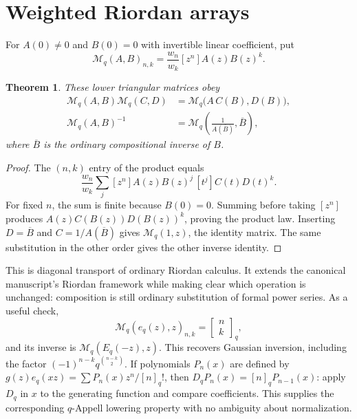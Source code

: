 \documentclass[11pt,a4paper,oneside,openany]{book}
\newtheorem{theorem}{Theorem}[chapter]
\theoremstyle{definition}
\theoremstyle{remark}
\newcommand{\GB}[3][q]{\begin{bmatrix}#2\\#3\end{bmatrix}_{#1}}
\newcommand{\G}[2]{\GB{#1}{#2}}
\newcommand{\qnum}[1]{[#1]_q}
\newcommand{\Dq}{D_q}
\begin{document}
\section{Weighted Riordan arrays}
For \(A(0)\ne0\) and \(B(0)=0\) with invertible linear coefficient, put
\begin{equation}\label{q1:qcc:riordan-def}
 \mathcal M_q(A,B)_{n,k}=\frac{w_n}{w_k}[z^n]A(z)B(z)^k.
\end{equation}
\begin{theorem}\label{q1:qcc:riordan-group}
These lower triangular matrices obey
\begin{align}
 \mathcal M_q(A,B)\mathcal M_q(C,D)
 &=\mathcal M_q\bigl(A\,C(B),D(B)\bigr),\label{q1:qcc:riordan-product}\\
 \mathcal M_q(A,B)^{-1}
 &=\mathcal M_q\left(\frac1{A(\overline B)},\overline B\right),
 \label{q1:qcc:riordan-inverse}
\end{align}
where \(\overline B\) is the ordinary compositional inverse of \(B\).
\end{theorem}
\begin{proof}
The \((n,k)\) entry of the product equals
\[
 \frac{w_n}{w_k}\sum_j[z^n]A(z)B(z)^j\,[t^j]C(t)D(t)^k.
\]
For fixed \(n\), the sum is finite because \(B(0)=0\). Summing before taking
\([z^n]\) produces \(A(z)C(B(z))D(B(z))^k\), proving the product law.
Inserting \(D=\overline B\) and \(C=1/A(\overline B)\) gives
\(\mathcal M_q(1,z)\), the identity matrix. The same substitution in the other
order gives the other inverse identity.
\end{proof}
This is diagonal transport of ordinary Riordan calculus. It extends the canonical manuscript's
Riordan framework while making clear which operation is unchanged: composition
is still ordinary substitution of formal power series.
As a useful check,
\[
 \mathcal M_q(e_q(z),z)_{n,k}=\G nk,
\]
and its inverse is $\mathcal M_q(E_q(-z),z)$. This recovers Gaussian inversion,
including the factor $(-1)^{n-k}q^{\binom{n-k}2}$.
If polynomials $P_n(x)$ are defined by
$g(z)e_q(xz)=\sum P_n(x)z^n/[n]_q!$, then
$\Dq P_n(x)=\qnum n P_{n-1}(x)$: apply $\Dq$ in $x$ to the generating
function and compare coefficients. This supplies the corresponding
$q$-Appell lowering property with no ambiguity about normalization.
\end{document}
